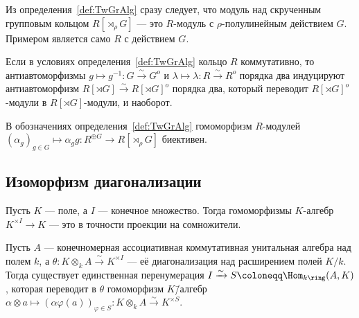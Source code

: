 \documentclass[
	extrafontsizes,
	11pt,
	hyphens,
]{memoir}
\begin{document}
\begin{remark}
Из определения~\ref{def:TwGrAlg} сразу следует, что модуль над скрученным групповым кольцом \(R[\rtimes_\rho G]\) --- это \(R\)-модуль с \(\rho\)-по\-лу\-ли\-ней\-ным действием \(G\).
Примером является само \(R\) с действием \(G\).
\end{remark}

\begin{observation} \label{obs:TwGrAlgInvol}
Если в условиях определения~\ref{def:TwGrAlg} кольцо \(R\) коммутативно,
то антиавтоморфизмы \(g \mapsto g^{-1} : G \xrightarrow{\sim} G^o\) и \(\lambda \mapsto \lambda : R \xrightarrow{\sim} R^o\) порядка два индуцируют антиавтоморфизм \(R[\rtimes G] \xrightarrow{\sim} R[\rtimes G]^o\) порядка два,
который переводит \(R[\rtimes G]^o\)-мо\-ду\-ли в \(R[\rtimes G]\)-мо\-ду\-ли, и наоборот.
\end{observation}

\begin{observation}
В обозначениях определения~\ref{def:TwGrAlg} гомоморфизм \(R\)-мо\-ду\-лей \((\alpha_g)_{g \in G} \mapsto \alpha_g g : R^{\oplus G} \to R[\rtimes_\rho G]\) биективен.
\end{observation}

\subsection{Изоморфизм диагонализации}

\begin{observation}
Пусть \(K\) --- поле, а \(I\) --- конечное множество.%
\label{obs:FieldPowProj}
Тогда
гомоморфизмы \(K\)-алгебр \(K^{\times I} \to K\)
--- это в точности проекции на сомножители.
\end{observation}

\begin{theorem}
Пусть \(A\) --- конечномерная ассоциативная коммутативная унитальная алгебра над полем \(k\),
а \(\theta : K \otimes_k A \xrightarrow{\sim} K^{\times I}\) --- её диагонализация над расширением полей \(K/k\).%
\label{thm:GalIsoOne}
Тогда существует единственная перенумерация \(I \xrightarrow{\sim} S \coloneqq \Hom_{k\ring}(A,K)\), которая переводит в \(\theta\) гомоморфизм
\(K\)\=/алгебр
\(\alpha \otimes a \mapsto (\alpha \varphi(a))_{\varphi \in S} : K \otimes_k A \xrightarrow{\sim} K^{\times S}\).
\end{theorem}
\end{document}
